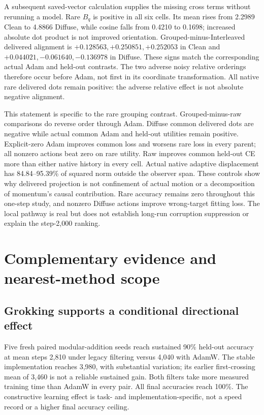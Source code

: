 \documentclass[10pt]{article}
\begin{document}
A subsequent saved-vector calculation supplies the missing cross terms without rerunning a model. Rare $B_q$ is positive in all six cells. Its mean rises from 2.2989 Clean to 4.8866 Diffuse, while cosine falls from 0.4210 to 0.1698; increased absolute dot product is not improved orientation. Grouped-minus-Interleaved delivered alignment is $+0.128563,+0.250851,+0.252053$ in Clean and $+0.044021,-0.061640,-0.136978$ in Diffuse. These signs match the corresponding actual Adam and held-out contrasts. The two adverse noisy relative orderings therefore occur before Adam, not first in its coordinate transformation. All native rare delivered dots remain positive: the adverse relative effect is not absolute negative alignment.

This statement is specific to the rare grouping contrast. Grouped-minus-raw comparisons do reverse order through Adam. Diffuse common delivered dots are negative while actual common Adam and held-out utilities remain positive. Explicit-zero Adam improves common loss and worsens rare loss in every parent; all nonzero actions beat zero on rare utility. Raw improves common held-out CE more than either native history in every cell. Actual native adaptive displacement has 84.84--95.39\% of squared norm outside the observer span. These controls show why delivered projection is not confinement of actual motion or a decomposition of momentum's causal contribution. Rare accuracy remains zero throughout this one-step study, and nonzero Diffuse actions improve wrong-target fitting loss. The local pathway is real but does not establish long-run corruption suppression or explain the step-2,000 ranking.

\section{Complementary evidence and nearest-method scope}
\label{sec:complement}
\subsection{Grokking supports a conditional directional effect}
Five fresh paired modular-addition seeds reach sustained 90\% held-out accuracy at mean steps 2,810 under legacy filtering versus 4,040 with AdamW. The stable implementation reaches 3,980, with substantial variation; its earlier first-crossing mean of 3,460 is not a reliable sustained gain. Both filters take more measured training time than AdamW in every pair. All final accuracies reach 100\%. The constructive learning effect is task- and implementation-specific, not a speed record or a higher final accuracy ceiling.
\end{document}
